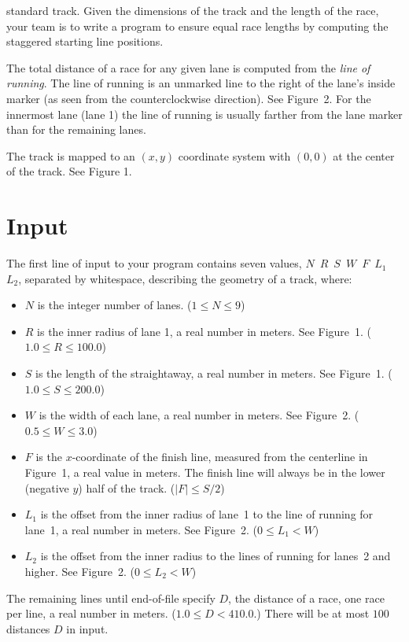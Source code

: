 standard track.  Given the dimensions of the track and the length of
the race, your team is to write a program to ensure equal race lengths
by computing the staggered starting line positions.
\par
The total distance of a race for any given lane is computed from the
{\sl line of running}.  The line of running is an unmarked line to
the right of the lane's inside marker (as seen from the
counterclockwise direction).  See Figure~2.  For the innermost lane
(lane 1) the line of running is usually farther from the lane marker
than for the remaining lanes.
\par
The track is mapped to an $(x, y)$ coordinate system with $(0, 0)$ at the
center of the track.  See Figure 1.

\section*{Input}

The first line of input to your program contains seven values,
\hbox{$N$ $R$ $S$ $W$ $F$ $L_1$ $L_2$},
separated by whitespace, describing the geometry of a track, where:
\begin{itemize}
	\item $N$ is the integer number of lanes. ($1 \le N \le 9$)
	\item $R$ is the inner radius of lane 1, a real number in meters.  See Figure~1.  ($1.0 \le R \le 100.0$)
	\item $S$ is the length of the straightaway, a real number in meters.
	See Figure~1.  ($1.0 \le S \le 200.0$)
	\item $W$ is the width of each lane, a real number in meters.
	See Figure~2.  ($0.5 \le W \le 3.0$)
	\item $F$ is the $x$-coordinate of the finish line, measured from the centerline in Figure~1, a real value
	in meters.  The finish line will always be in the lower (negative $y$) half of the track.  ($\vert F\vert \le S / 2$)
	\item $L_1$ is the offset from the inner radius of lane~1 to the line of running for lane~1, a real number in meters.
	See Figure~2.  ($0 \le L_1 < W$)
	\item $L_2$ is the offset from the inner radius to the lines of running for lanes~2 and higher.  See Figure~2.  ($0 \le L_2 < W$)
\end{itemize}
The remaining lines until end-of-file specify $D$, the distance of a race, one race per line, a real number in meters. ($1.0 \le D < 410.0$.) There will be at most $100$ distances $D$ in input.

